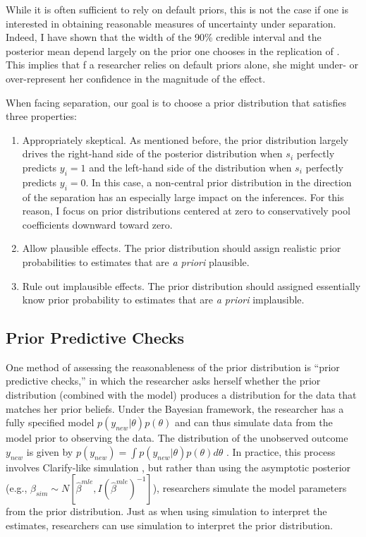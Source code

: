 \documentclass[12pt]{article}
\begin{document}
While it is often sufficient to rely on default priors, this is not the case if one is interested in obtaining reasonable measures of uncertainty under separation. Indeed, I have shown that the width of the 90\% credible interval and the posterior mean depend largely on the prior one chooses in the replication of \cite{BarrilleauxRainey2014}. This implies that f a researcher relies on default priors alone, she might under- or over-represent her confidence in the magnitude of the effect.

When facing separation, our goal is to choose a prior distribution that satisfies three properties:
\begin{enumerate}
\item Appropriately skeptical. As mentioned before, the prior distribution largely drives the right-hand side of the posterior distribution when $s_i$ perfectly predicts $y_i = 1$ and the left-hand side of the distribution when $s_i$ perfectly predicts $y_i = 0$. In this case, a non-central prior distribution in the direction of the separation has an especially large impact on the inferences. For this reason, I focus on prior distributions centered at zero to conservatively pool coefficients downward toward zero.
\item Allow plausible effects. The prior distribution should assign realistic prior probabilities to estimates that are \textit{a priori} plausible. 
\item Rule out implausible effects. The prior distribution should assigned essentially know prior probability to estimates that are \textit{a priori} implausible.
\end{enumerate}


\subsection*{Prior Predictive Checks}

One method of assessing the reasonableness of the prior distribution is ``prior predictive checks,'' in which the researcher asks herself whether the prior distribution (combined with the model) produces a distribution for the data that matches her prior beliefs. Under the Bayesian framework, the researcher has a fully specified model $p(y_{new}|\theta)p(\theta)$ and can thus simulate data from the model prior to observing the data. The distribution of the unobserved outcome $y_{new}$ is given by $p(y_{new}) = \int p(y_{new} | \theta)p(\theta) d\theta$ \citep{Box1980}. In practice, this process involves Clarify-like simulation \citep{KingTomzWittenberg2000}, but rather than using the asymptotic posterior (e.g., $\beta_{sim} \sim N\left[\hat{\beta}^{mle}, I(\hat{\beta}^{mle})^{-1}\right]$), researchers simulate the model parameters from the prior distribution. Just as when using simulation to interpret the estimates, researchers can use simulation to interpret the prior distribution.
\end{document}
